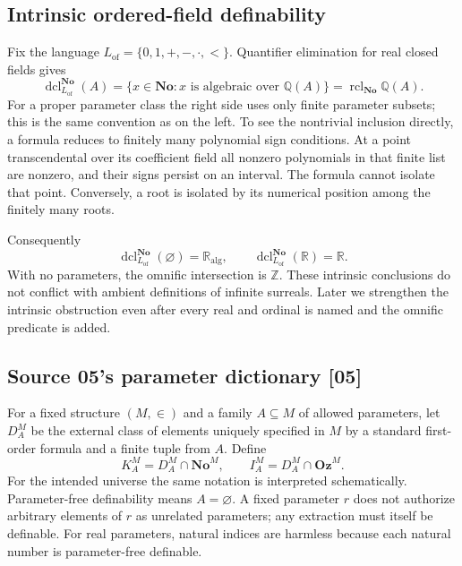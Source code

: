 \documentclass[11pt,a4paper]{article}
\numberwithin{equation}{section}
\theoremstyle{definition}
\theoremstyle{remark}
\newcommand{\No}{\mathbf{No}}
\newcommand{\Oz}{\mathbf{Oz}}
\newcommand{\Z}{\mathbb Z}
\newcommand{\Q}{\mathbb Q}
\newcommand{\R}{\mathbb R}
\newcommand{\dcl}{\operatorname{dcl}}
\newcommand{\RC}{\operatorname{rcl}}
\newcommand{\src}[1]{\textup{\textsf{\small[#1]}}}
\begin{document}
\subsection{Intrinsic ordered-field definability}

Fix the language $L_{\mathrm{of}}=\{0,1,+,-,\cdot,<\}$. Quantifier
elimination for real closed fields gives
\begin{equation}\label{dsn:rp:eq:fielddcl}
 \dcl_{L_{\mathrm{of}}}^{\No}(A)
   =\{x\in\No:x\text{ is algebraic over }\Q(A)\}
   =\RC_{\No}\Q(A).
\end{equation}
For a proper parameter class the right side uses only finite parameter
subsets; this is the same convention as on the left.
To see the nontrivial inclusion directly, a formula reduces to finitely
many polynomial sign conditions. At a point transcendental over its
coefficient field all nonzero polynomials in that finite list are
nonzero, and their signs persist on an interval. The formula cannot
isolate that point. Conversely, a root is isolated by its numerical
position among the finitely many roots.

Consequently
\[
 \dcl_{L_{\mathrm{of}}}^{\No}(\varnothing)=\R_{\mathrm{alg}},\qquad
 \dcl_{L_{\mathrm{of}}}^{\No}(\R)=\R.
\]
With no parameters, the omnific intersection is $\Z$. These intrinsic
conclusions do not conflict with ambient definitions of infinite
surreals. Later we strengthen the intrinsic obstruction even after every
real and ordinal is named and the omnific predicate is added.




\subsection{Source 05's parameter dictionary \src{05}}
\label{dsn:ca:sec:definitions}

For a fixed structure $(M,\in)$ and a family $A\subseteq M$ of allowed
parameters, let $D_A^M$ be the external class of elements uniquely
specified in $M$ by a standard first-order formula and a finite tuple
from $A$. Define
\[
 K_A^M=D_A^M\cap\No^M,\qquad I_A^M=D_A^M\cap\Oz^M.
\]
For the intended universe the same notation is interpreted schematically.
Parameter-free definability means $A=\varnothing$. A fixed parameter
$r$ does not authorize arbitrary elements of $r$ as unrelated parameters;
any extraction must itself be definable. For real parameters, natural
indices are harmless because each natural number is parameter-free
definable.
\end{document}

